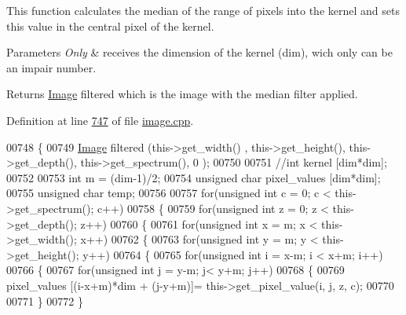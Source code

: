This function calculates the median of the range of pixels into the kernel and sets this value in the central pixel of the kernel. 


\begin{DoxyParams}{Parameters}
{\em Only} & receives the dimension of the kernel (dim), wich only can be an impair number. \\
\hline
\end{DoxyParams}
\begin{DoxyReturn}{Returns}
\hyperlink{class_image}{Image} filtered which is the image with the median filter applied. 
\end{DoxyReturn}


Definition at line \hyperlink{image_8cpp_source_l00747}{747} of file \hyperlink{image_8cpp_source}{image.\-cpp}.


\begin{DoxyCode}
00748 \{
00749     \hyperlink{class_image}{Image} filtered (this->get\_width() , this->get\_height(), this->get\_depth(), this->get\_spectrum(), 0
      ); 
00750     
00751     \textcolor{comment}{//int kernel [dim*dim];}
00752 
00753     \textcolor{keywordtype}{int} m = (dim-1)/2;
00754     \textcolor{keywordtype}{unsigned} \textcolor{keywordtype}{char} pixel\_values [dim*dim];
00755     \textcolor{keywordtype}{unsigned} \textcolor{keywordtype}{char} temp;
00756     
00757     \textcolor{keywordflow}{for}(\textcolor{keywordtype}{unsigned} \textcolor{keywordtype}{int} c = 0; c < this->get\_spectrum(); c++)
00758     \{
00759         \textcolor{keywordflow}{for}(\textcolor{keywordtype}{unsigned} \textcolor{keywordtype}{int} z = 0; z < this->get\_depth(); z++)
00760         \{
00761             \textcolor{keywordflow}{for}(\textcolor{keywordtype}{unsigned} \textcolor{keywordtype}{int} x = m; x < this->get\_width(); x++)
00762             \{
00763                 \textcolor{keywordflow}{for}(\textcolor{keywordtype}{unsigned} \textcolor{keywordtype}{int} y = m; y < this->get\_height(); y++)
00764                 \{
00765                     \textcolor{keywordflow}{for}(\textcolor{keywordtype}{unsigned} \textcolor{keywordtype}{int} i = x-m; i < x+m; i++)
00766                     \{
00767                         \textcolor{keywordflow}{for}(\textcolor{keywordtype}{unsigned} \textcolor{keywordtype}{int} j = y-m; j< y+m; j++)
00768                         \{
00769                             pixel\_values [(i-x+m)*dim + (j-y+m)]= this->get\_pixel\_value(i, j, z, c);
00770                             
00771                         \}   
00772                     \}

\end{DoxyCode}
